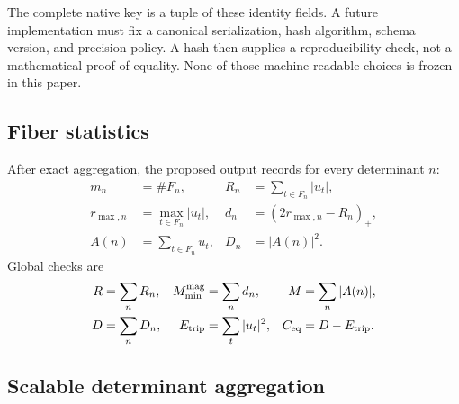 The complete native key is a tuple of these identity fields.  A future
implementation must fix a canonical serialization, hash algorithm,
schema version, and precision policy.  A hash then supplies a
reproducibility check, not a mathematical proof of equality.  None of
those machine-readable choices is frozen in this paper.

\subsection{Fiber statistics}

After exact aggregation, the proposed output records for every
determinant \(n\):
\begin{equation}
\begin{aligned}
 m_n&=\#F_n,&
 R_n&=\sum_{t\in F_n}|u_t|,\\
 r_{\max,n}&=\max_{t\in F_n}|u_t|,&
 d_n&=(2r_{\max,n}-R_n)_+,\\
 A(n)&=\sum_{t\in F_n}u_t,&
 D_n&=|A(n)|^2.
\end{aligned}
\label{eq:fiber-census-fields}
\end{equation}
Global checks are
\begin{equation}
\begin{aligned}
 R&=\sum_nR_n,
 &M_{\min}^{\rm mag}&=\sum_nd_n,
 &M&=\sum_n|A(n)|,\\
 D&=\sum_nD_n,
 &E_{\mathrm{trip}}&=\sum_t|u_t|^2,
 &C_{\mathrm{eq}}&=D-E_{\mathrm{trip}}.
\end{aligned}
\label{eq:global-census-checks}
\end{equation}
\subsection{Scalable determinant aggregation}

